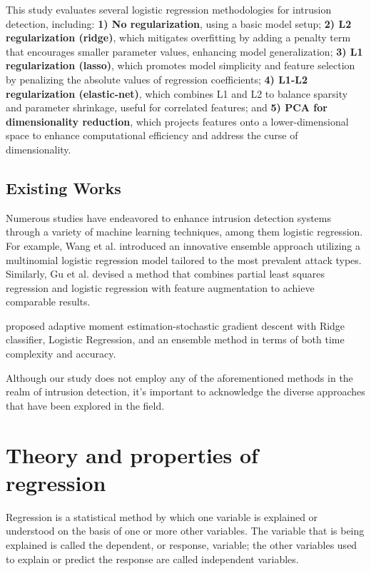 \documentclass[a4paper,10pt,twocolumn]{article}
\begin{document}
This study evaluates several logistic regression methodologies for intrusion detection, including: \textbf{1) No regularization}, using a basic model setup; \textbf{2) L2 regularization (ridge)}, which mitigates overfitting by adding a penalty term that encourages smaller parameter values, enhancing model generalization; \textbf{3) L1 regularization (lasso)}, which promotes model simplicity and feature selection by penalizing the absolute values of regression coefficients; \textbf{4) L1-L2 regularization (elastic-net)}, which combines L1 and L2 to balance sparsity and parameter shrinkage, useful for correlated features; and \textbf{5) PCA for dimensionality reduction}, which projects features onto a lower-dimensional space to enhance computational efficiency and address the curse of dimensionality.

\subsection*{Existing Works}
Numerous studies have endeavored to enhance intrusion detection systems through a variety of machine learning techniques, among them logistic regression. For example, Wang et al. \cite{wang2005multinomial} introduced an innovative ensemble approach utilizing a multinomial logistic regression model tailored to the most prevalent attack types. Similarly, Gu et al. \cite{gu2020effective} devised a method that combines partial least squares regression and logistic regression with feature augmentation to achieve comparable results.

\cite{shyla2022optimization} proposed adaptive moment estimation-stochastic gradient descent with Ridge classifier, Logistic Regression, and an ensemble method in terms of both time complexity and accuracy.

Although our study does not employ any of the aforementioned methods in the realm of intrusion detection, it's important to acknowledge the diverse approaches that have been explored in the field.

\section{Theory and properties of regression}
Regression is a statistical method by which one variable is explained or understood on the basis of one or more other variables. The variable that is being explained is called the dependent, or response, variable; the other variables used to explain or predict the response are called independent variables.
\cite{alma991003312373606666}
\end{document}
